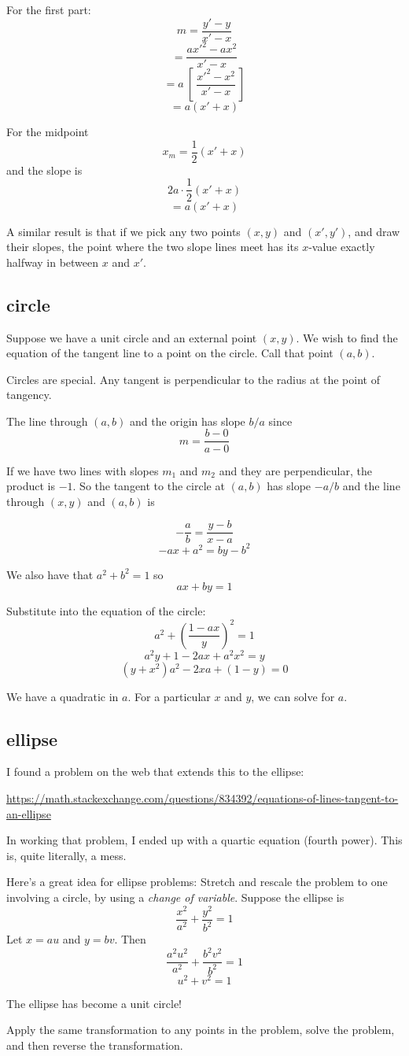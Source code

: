 \documentclass[11pt, oneside]{article}
\begin{document}
For the first part:
\[ m = \frac{y'-y}{x'-x} \]
\[ = \frac{ax'^2 - ax^2}{x'-x} \]
\[ = a \ [ \ \frac{x'^2 - x^2}{x' - x} \ ] \]
\[ = a(x' + x) \]

For the midpoint
\[ x_m = \frac{1}{2} (x' + x) \]
and the slope is
\[ 2a \cdot \frac{1}{2} (x' + x) \]
\[ = a(x' + x) \]

A similar result is that if we pick any two points $(x,y)$ and $(x',y')$, and draw their slopes, the point where the two slope lines meet has its $x$-value exactly halfway in between $x$ and $x'$.

\subsection*{circle}

Suppose we have a unit circle and an external point $(x,y)$.  We wish to find the equation of the tangent line to a point on the circle.  Call that point $(a,b)$.

Circles are special.  Any tangent is perpendicular to the radius at the point of tangency.  

The line through $(a,b)$ and the origin has slope $b/a$ since
\[ m = \frac{b - 0}{a - 0} \]

If we have two lines with slopes $m_1$ and $m_2$ and they are perpendicular, the product is $-1$.  So the tangent to the circle at $(a,b)$ has slope $-a/b$ and the line through $(x,y)$ and $(a,b)$ is

\[ -\frac{a}{b} = \frac{y - b}{x - a} \]
\[ - ax + a^2 = by - b^2 \]

We also have that $a^2 + b^2 = 1$ so
\[ ax + by = 1 \]

Substitute into the equation of the circle:
\[ a^2 + (\frac{1 - ax}{y})^2 = 1 \]
\[ a^2y + 1 - 2ax + a^2x^2 = y \]
\[ (y + x^2)a^2 - 2xa + (1 - y) = 0 \]

We have a quadratic in $a$.  For a particular $x$ and $y$, we can solve for $a$.

\subsection*{ellipse}
I found a problem on the web that extends this to the ellipse:

\url{https://math.stackexchange.com/questions/834392/equations-of-lines-tangent-to-an-ellipse}

In working that problem, I ended up with a quartic equation (fourth power).  This is, quite literally, a mess.

Here's a great idea for ellipse problems:  Stretch and rescale the problem to one involving a circle, by using a \emph{change of variable}.  Suppose the ellipse is
\[ \frac{x^2}{a^2} + \frac{y^2}{b^2} = 1 \]
Let $x = au$ and $y = bv$.  Then
\[ \frac{a^2u^2}{a^2} + \frac{b^2 v^2}{b^2} = 1 \]
\[ u^2 + v^2 = 1 \]

The ellipse has become a unit circle!

Apply the same transformation to any points in the problem, solve the problem, and then reverse the transformation.
\end{document}
